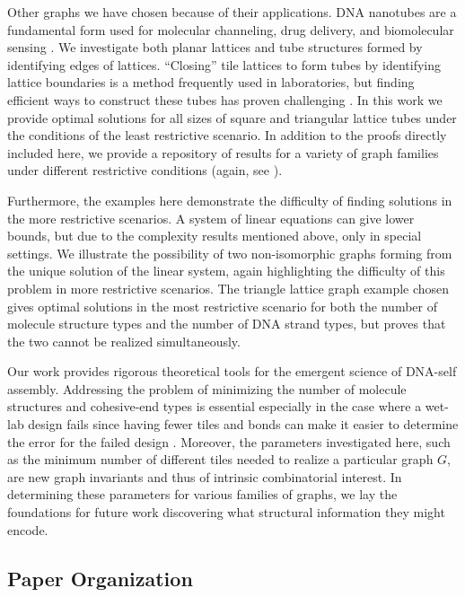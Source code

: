 \documentclass{elsarticle}
\theoremstyle{definition}
\theoremstyle{remark}
\theoremstyle{plain}
\theoremstyle{plain}
\begin{document}
Other graphs we have chosen because of their applications. DNA nanotubes are a fundamental form used for molecular channeling, drug delivery, and biomolecular sensing \cite{rothemund2004design, wilner2011self}. We investigate both planar lattices and tube structures formed by identifying edges of lattices. ``Closing'' tile lattices to form tubes by identifying lattice boundaries is a method frequently used in laboratories, but finding efficient ways to construct these tubes has proven challenging \cite{Liu2019, wilner2011self}.  In this work we provide optimal solutions for all sizes of square and triangular lattice tubes under the conditions of the least restrictive scenario. In addition to the proofs directly included here, we provide a repository of results for a variety of graph families under different restrictive conditions (again, see \cite{repository}). 

Furthermore, the examples here demonstrate the difficulty of finding solutions in the more restrictive scenarios.  A system of linear equations can give lower bounds, but due to the complexity results mentioned above, only in special settings. We illustrate the possibility of two non-isomorphic graphs forming from the unique solution of the linear system, again highlighting the difficulty of this problem in more restrictive scenarios. The triangle lattice graph example chosen gives optimal solutions in the most restrictive scenario for both the number of molecule structure types and the number of DNA strand types, but proves that the two cannot be realized simultaneously. 

Our work provides rigorous theoretical tools for the emergent science of DNA-self assembly.  Addressing the problem of minimizing the number of molecule structures and cohesive-end types is essential especially in the case where a wet-lab design fails since having fewer tiles and bonds can make it easier to determine the error for the failed design \cite{hansen2018DNA}.  Moreover, the parameters investigated here, such as the minimum number of different tiles needed to realize a particular graph $G$, are new graph invariants and thus of intrinsic combinatorial interest.  In determining these parameters for various families of graphs, we lay the foundations for future work discovering what structural information they might encode.

\subsection{Paper Organization}
\end{document}
